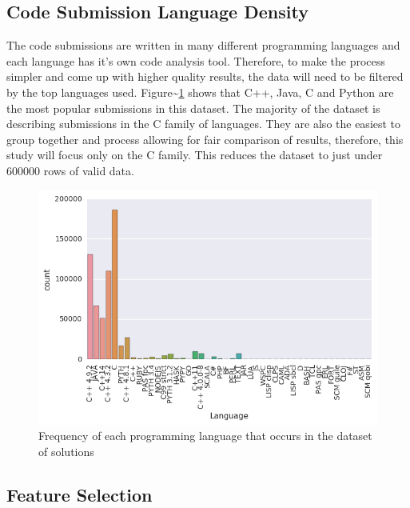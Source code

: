 \documentclass{article}
\begin{document}
\subsection{Code Submission Language
Density}\label{code-submission-language-density}

The code submissions are written in many different programming languages
and each language has it's own code analysis tool. Therefore, to make
the process simpler and come up with higher quality results, the data
will need to be filtered by the top languages used.
Figure\textasciitilde{}\ref{languages} shows that C++, Java, C and
Python are the most popular submissions in this dataset. The majority of
the dataset is describing submissions in the C family of languages. They
are also the easiest to group together and process allowing for fair
comparison of results, therefore, this study will focus only on the C
family. This reduces the dataset to just under 600000 rows of valid
data.

\begin{figure}[ht] \vskip 0.2in \begin{center}
\centerline{\includegraphics[width=\columnwidth]{../images/languages.png}}
\caption{Frequency of each programming language that occurs in the dataset of
solutions } \label{languages} \end{center} \vskip -0.2in \end{figure}

\citet{kernalnlp}

\subsection{Feature Selection}\label{feature-selection}
\end{document}
